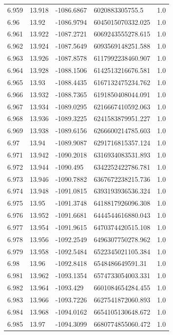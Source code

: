 \begin{tabular}{lllll}
6.959 & 13.918 & -1086.6867 & 6020883305755.5 & 1.0 \\
6.96 & 13.92 & -1086.9794 & 6045015070332.025 & 1.0 \\
6.961 & 13.922 & -1087.2721 & 6069243555278.615 & 1.0 \\
6.962 & 13.924 & -1087.5649 & 6093569148251.588 & 1.0 \\
6.963 & 13.926 & -1087.8578 & 6117992238460.907 & 1.0 \\
6.964 & 13.928 & -1088.1506 & 6142513216676.581 & 1.0 \\
6.965 & 13.93 & -1088.4435 & 6167132475234.762 & 1.0 \\
6.966 & 13.932 & -1088.7365 & 6191850408044.091 & 1.0 \\
6.967 & 13.934 & -1089.0295 & 6216667410592.063 & 1.0 \\
6.968 & 13.936 & -1089.3225 & 6241583879951.227 & 1.0 \\
6.969 & 13.938 & -1089.6156 & 6266600214785.603 & 1.0 \\
6.97 & 13.94 & -1089.9087 & 6291716815357.124 & 1.0 \\
6.971 & 13.942 & -1090.2018 & 6316934083531.893 & 1.0 \\
6.972 & 13.944 & -1090.495 & 6342252422786.781 & 1.0 \\
6.973 & 13.946 & -1090.7882 & 6367672238215.736 & 1.0 \\
6.974 & 13.948 & -1091.0815 & 6393193936536.324 & 1.0 \\
6.975 & 13.95 & -1091.3748 & 6418817926096.308 & 1.0 \\
6.976 & 13.952 & -1091.6681 & 6444544616880.043 & 1.0 \\
6.977 & 13.954 & -1091.9615 & 6470374420515.108 & 1.0 \\
6.978 & 13.956 & -1092.2549 & 6496307750278.962 & 1.0 \\
6.979 & 13.958 & -1092.5484 & 6522345021105.384 & 1.0 \\
6.98 & 13.96 & -1092.8418 & 6548486649591.31 & 1.0 \\
6.981 & 13.962 & -1093.1354 & 6574733054003.331 & 1.0 \\
6.982 & 13.964 & -1093.429 & 6601084654284.455 & 1.0 \\
6.983 & 13.966 & -1093.7226 & 6627541872060.893 & 1.0 \\
6.984 & 13.968 & -1094.0162 & 6654105130648.672 & 1.0 \\
6.985 & 13.97 & -1094.3099 & 6680774855060.472 & 1.0 \\

\end{tabular}
